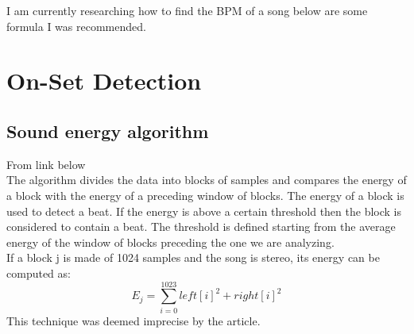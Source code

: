 \documentclass[a4paper]{article}
\begin{document}
    I am currently researching how to find the BPM of a song below are some formula I was recommended.
    \section{On-Set Detection}
        \subsection{Sound energy algorithm}
            From link below \\
            The algorithm divides the data into blocks of samples and compares the energy of a block
            with the energy of a preceding window of blocks. The energy of a block is used to detect a beat. If the
            energy is above a certain threshold then the block is considered to contain a beat. The threshold is defined
            starting from the average energy of the window of blocks preceding the one we are analyzing.\\
            If a block j is made of 1024 samples and the song is stereo, its energy can be computed as:
            \[E_j = \sum_{i=0}^{1023}left[i]^2 + right[i]^2  \]
            This technique was deemed imprecise by the article.
\end{document}
